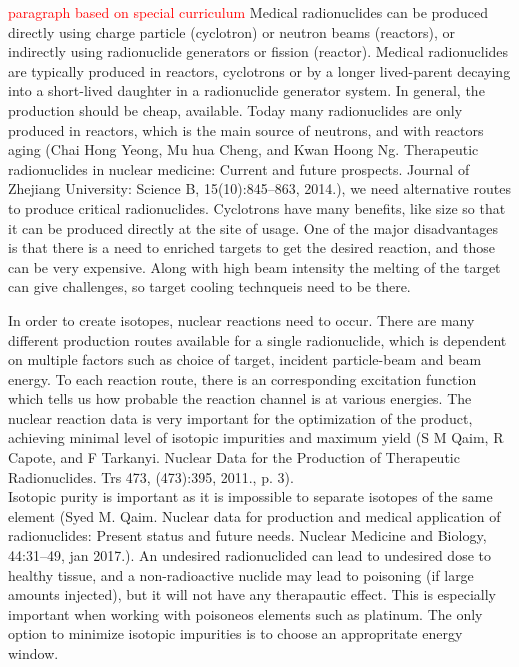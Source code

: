 \documentclass[a4paper,11pt,twoside]{book}
\begin{document}
\textcolor{red}{paragraph based on special curriculum}
Medical radionuclides can be produced directly using charge particle (cyclotron) or neutron beams (reactors), or indirectly using radionuclide generators or fission (reactor). Medical radionuclides are typically produced in reactors, cyclotrons or by a longer lived-parent decaying into a short-lived daughter in a radionuclide generator system. In general, the production should be cheap, available. Today many radionuclides are only produced in reactors, which is the main source of neutrons, and with reactors aging (Chai Hong Yeong, Mu hua Cheng, and Kwan Hoong Ng. Therapeutic radionuclides in nuclear medicine: Current and future prospects. Journal of Zhejiang University: Science B,
15(10):845–863, 2014.), we need alternative routes to produce critical radionuclides. Cyclotrons have many benefits, like size so that it can be produced directly at the site of usage. One of the major disadvantages is that there is a need to enriched targets to get the desired reaction, and those can be very expensive. Along with high beam intensity the melting of the target can give challenges, so target cooling technqueis need to be there.    

In order to create isotopes, nuclear reactions need to occur. There are many different production routes available for a single radionuclide, which is dependent on multiple factors such as choice of target, incident particle-beam and beam energy. To each reaction route, there is an corresponding excitation function which tells us how probable the reaction channel is at various energies. The nuclear reaction data is very important for the optimization of the product, achieving minimal level of isotopic impurities and maximum yield (S M Qaim, R Capote, and F Tarkanyi. Nuclear Data for the Production of Therapeutic Radionuclides.
Trs 473, (473):395, 2011., p. 3). \\

Isotopic purity is important as it is impossible to separate isotopes of the same element (Syed M. Qaim. Nuclear data for production and medical application of radionuclides:
Present status and future needs. Nuclear Medicine and Biology, 44:31–49, jan 2017.). An undesired radionuclided can lead to undesired dose to healthy tissue, and a non-radioactive nuclide may lead to  poisoning (if large amounts injected), but it will not have any therapautic effect. This is especially important when working with poisoneos elements such as platinum. The only option to minimize isotopic impurities is to choose an appropritate energy window. 
\end{document}
